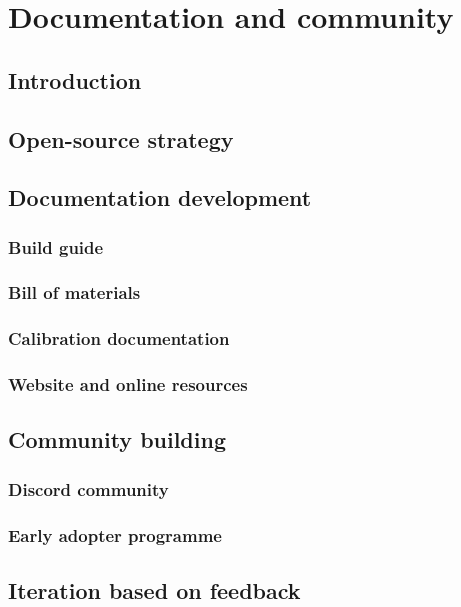 \chapter{Documentation and community}
\label{chap:documentation}

\section{Introduction}
\label{sec:doc-intro}

\section{Open-source strategy}
\label{sec:doc-strategy}

\section{Documentation development}
\label{sec:doc-development}

\subsection{Build guide}
\subsection{Bill of materials}
\subsection{Calibration documentation}
\subsection{Website and online resources}

\section{Community building}
\label{sec:doc-community}

\subsection{Discord community}
\subsection{Early adopter programme}

\section{Iteration based on feedback}
\label{sec:doc-iteration}
